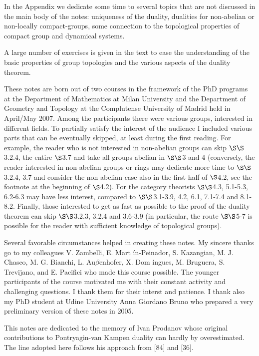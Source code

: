 \documentclass[12pt]{article}
\begin{document}
        In the Appendix we dedicate some time to several topics that are not discussed in the main body of the
    notes: uniqueness of the duality, dualities for non-abelian or non-locally compact-groups, some connection to
    the topological properties of compact group and dynamical systems.
    

        A large number of exercises is given in the text to ease the understanding of the basic properties of group
    topologies and the various aspects of the duality theorem.
       

        These notes are born out of two courses in the framework of the PhD programs at the Department of
    Mathematics at Milan University and the Department of Geometry and Topology at the Complutense University
    of Madrid held in April/May 2007. Among the participants there were various groups, interested in different
    fields. To partially satisfy the interest of the audience I included various parts that can be eventually skipped,
    at least during the first reading. For example, the reader who is not interested in non-abelian groups can skip
    $ \S\S $3.2.4, the entire $ \S $3.7 and take all groups abelian in $ \S\S $3 and 4 (conversely, the reader interested in non-abelian
    groups or rings may dedicate more time to $ \S\S $3.2.4, 3.7 and consider the non-abelian case also in the first half of
    $ \S $4.2, see the footnote at the beginning of $ \S $4.2). For the category theorists $ \S\S $4.3, 5.1-5.3, 6.2-6.3 may have less
    interest, compared to $ \S\S $3.1-3.9, 4.2, 6.1, 7.1-7.4 and 8.1-8.2. Finally, those interested to get as fast as possible
    to the proof of the duality theorem can skip $ \S\S $3.2.3, 3.2.4 and 3.6-3.9 (in particular, the route $ \S\S $5-7 is possible
    for the reader with sufficient knowledge of topological groups).
    

        Several favorable circumstances helped in creating these notes. My sincere thanks go to my colleagues V.
    Zambelli, E. Mart \'in-Peinador, S. Kazangian, M. J. Chasco, M. G. Bianchi, L. Au$ \beta $enhofer, X. Dom \'ingues,
    M. Bruguera, S. Trevijano, and E. Pacifici who made this course possible. The younger participants of the
    course motivated me with their constant activity and challenging questions. I thank them for their interst
    and patience. I thank also my PhD student at Udine University Anna Giordano Bruno who prepared a very
    preliminary version of these notes in 2005.
    

        This notes are dedicated to the memory of Ivan Prodanov whose original contributions to Pontryagin-van
    Kampen duality can hardly by overestimated. The line adopted here follows his approach from [84] and [36].
\end{document}
